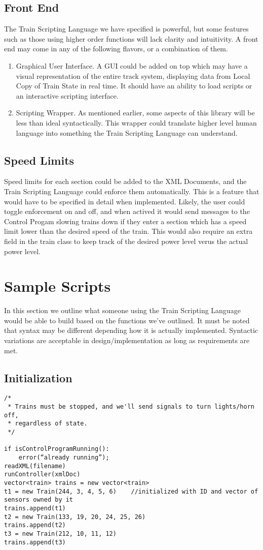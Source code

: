 \documentclass[a4paper,11pt,notitlepage]{article}
\def\TSL{Train Scripting Language\xspace}
\def\CS{Control Progam\xspace}
\def\LC{Local Copy of Train State\xspace}
\begin{document}
\subsection{Front End}
The \TSL we have specified is powerful, but some features such as those using higher order functions will lack clarity and intuitivity. A front end may come in any of the following flavors, or a combination of them.
\begin{enumerate}
    \item Graphical User Interface. A GUI could be added on top which may have a visual representation of the entire track system, displaying data from \LC in real time. It should have an ability to load scripts or an interactive scripting interface.
    \item Scripting Wrapper. As mentioned earlier, some aspects of this library will be less than ideal syntactically. This wrapper could translate higher level human language into something the \TSL can understand.
\end{enumerate}
\subsection{Speed Limits}
Speed limits for each section could be added to the XML Documents, and the \TSL could enforce them automatically. This is a feature that would have to be specified in detail when implemented. Likely, the user could toggle enforcement on and off, and when actived it would send messages to the \CS slowing trains down if they enter a section which has a speed limit lower than the desired speed of the train. This would also require an extra field in the train class to keep track of the desired power level verus the actual power level.

\newpage
\section{Sample Scripts}
In this section we outline what someone using the \TSL would be able to build based on the functions we've outlined. It must be noted that syntax may be different depending how it is actually implemented. Syntactic variations are acceptable in design/implementation as long as requirements are met.

\subsection{Initialization}
\begin{verbatim}
/*
 * Trains must be stopped, and we'll send signals to turn lights/horn off,
 * regardless of state.
 */

if isControlProgramRunning():
    error(“already running”);
readXML(filename)
runController(xmlDoc)
vector<train> trains = new vector<train>
t1 = new Train(244, 3, 4, 5, 6)    //initialized with ID and vector of sensors owned by it
trains.append(t1)
t2 = new Train(133, 19, 20, 24, 25, 26)
trains.append(t2)
t3 = new Train(212, 10, 11, 12)
trains.append(t3)
\end{verbatim}
\end{document}
